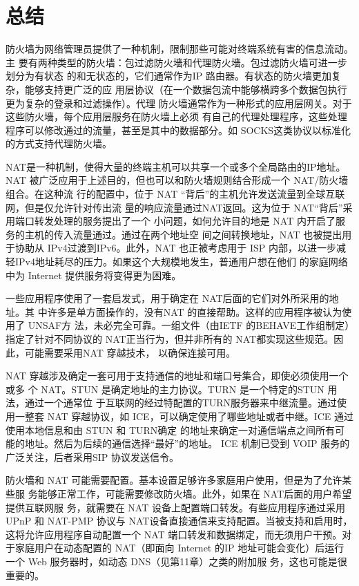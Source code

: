\section{总结}

防火墙为网络管理员提供了一种机制，限制那些可能对终端系统有害的信息流动。主
要有两种类型的防火墙：包过滤防火墻和代理防火墻。包过滤防火墙可进一步划分为有状态
的和无状态的，它们通常作为IP 路由器。有状态的防火墙更加复杂，能够支持更广泛的应
用层协议（在一个数据包流中能够横跨多个数据包执行更为复杂的登录和过滤操作）。代理
防火墙通常作为一种形式的应用层网关。对于这些防火墻，每个应用层服务在防火墙上必须
有自己的代理处理程序，这些处理程序可以修改通过的流量，甚至是其中的数据部分。如
SOCKS这类协议以标准化的方式支持代理防火墙。

NAT是一种机制，使得大量的终端主机可以共享一个或多个全局路由的IP地址。NAT
被广泛应用于上述目的，但也可以和防火墙规则结合形成一个 NAT/防火墙组合。在这种流
行的配置中，位于 NAT “背后”的主机允许发送流量到全球互联网，但是仅允许针对传出流
量的响应流量通过NAT返回。这为位于 NAT“背后”采用端口转发处理的服务提出了一个
小问题，如何允许目的地是 NAT 内开启了服务的主机的传入流量通过。通过在两个地址空
间之间转换地址，NAT 也被提出用于协助从 IPv4过渡到IPv6。此外，NAT 也正被考虑用于
ISP 内部，以进一步减轻IPv4地址耗尽的压力。如果这个大规模地发生，普通用户想在他们
的家庭网络中为 Internet 提供服务将变得更为困难。

一些应用程序使用了一套启发式，用于确定在 NAT后面的它们对外所采用的地址。其
中许多是单方面操作的，没有NAT 的直接帮助。这样的应用程序被认为使用了 UNSAF方
法，未必完全可靠。一组文件（由IETF 的BEHAVE工作组制定）指定了针对不同协议的
NAT正当行为，但并非所有的 NAT都实现这些规范。因此，可能需要采用NAT 穿越技术，
以确保连接可用。

NAT 穿越涉及确定一套可用于支持通信的地址和端口号集合，即使必须使用一个或多
个 NAT。STUN 是确定地址的主力协议。TURN 是一个特定的STUN 用法，通过一个通常位
于互联网的经过特配置的TURN服务器来中继流量。通过使用一整套 NAT 穿越协议，如
ICE，可以确定使用了哪些地址或者中继。ICE 通过使用本地信息和由 STUN 和 TURN确定
的地址来确定一对通信端点之间所有可能的地址。然后为后续的通信选择“最好”的地址。
ICE 机制已受到 VOIP 服务的广泛关注，后者采用SIP 协议发送信令。

防火墻和 NAT 可能需要配置。基本设置足够许多家庭用户使用，但是为了允许某些服
务能够正常工作，可能需要修改防火墙。此外，如果在 NAT后面的用户希望提供互联网服
务，就需要在 NAT 设备上配置端口转发。有些应用程序通过采用 UPnP 和 NAT-PMP 协议与
NAT设备直接通信来支持配置。当被支持和启用时，这将允许应用程序自动配置一个 NAT
端口转发和数据绑定，而无须用户干预。对于家庭用户在动态配置的 NAT（即面向 Internet
的IP 地址可能会变化）后运行一个 Web 服务器时，如动态 DNS（见第11章）之类的附加服
务，这也可能是很重要的。

